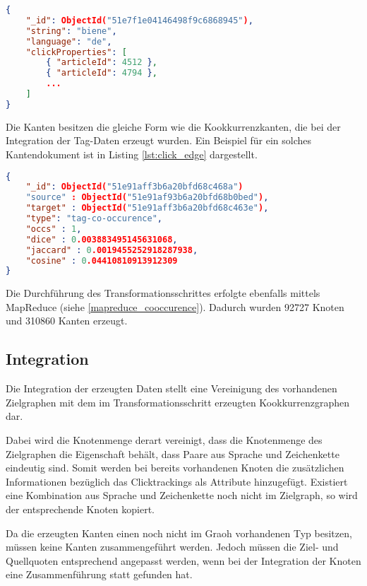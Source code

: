 \begin{lstlisting}[language=json, label={lst:click_node}, caption={Knotendokument mit Clicktracking-Eigenschaften}]
{
    "_id": ObjectId("51e7f1e04146498f9c6868945"),
    "string": "biene",
    "language": "de",
    "clickProperties": [
        { "articleId": 4512 },
        { "articleId": 4794 },
        ...
    ]
}
\end{lstlisting}

Die Kanten besitzen die gleiche Form wie die Kookkurrenzkanten, die bei der Integration der Tag-Daten erzeugt wurden. Ein Beispiel für ein solches Kantendokument ist in Listing \ref{lst:click_edge} dargestellt.

\begin{lstlisting}[language=json, label={lst:click_edge}, caption={Clicktracking-Kookkurrenzkante}]
{
    "_id": ObjectId("51e91aff3b6a20bfd68c468a")
    "source" : ObjectId("51e91af93b6a20bfd68b0bed"),
    "target" : ObjectId("51e91aff3b6a20bfd68c463e"),
    "type": "tag-co-occurence",
    "occs" : 1,
    "dice" : 0.003883495145631068,
    "jaccard" : 0.0019455252918287938,
    "cosine" : 0.04410810913912309
}
\end{lstlisting}

Die Durchführung des Transformationsschrittes erfolgte ebenfalls mittels MapReduce (siehe \ref{mapreduce_cooccurence}). Dadurch wurden \num{92727} Knoten und \num{310860} Kanten erzeugt.

\subsection{Integration}
\label{click_integration}

Die Integration der erzeugten Daten stellt eine Vereinigung des vorhandenen Zielgraphen mit dem im Transformationsschritt erzeugten Kookkurrenzgraphen dar.

Dabei wird die Knotenmenge derart vereinigt, dass die Knotenmenge des Zielgraphen die Eigenschaft behält, dass Paare aus Sprache und Zeichenkette eindeutig sind. Somit werden bei bereits vorhandenen Knoten die zusätzlichen Informationen bezüglich das Clicktrackings als Attribute hinzugefügt. Existiert eine Kombination aus Sprache und Zeichenkette noch nicht im Zielgraph, so wird der entsprechende Knoten kopiert.

Da die erzeugten Kanten einen noch nicht im Graoh vorhandenen Typ besitzen, müssen keine Kanten zusammengeführt werden. Jedoch müssen die Ziel- und Quellquoten entsprechend angepasst werden, wenn bei der Integration der Knoten eine Zusammenführung statt gefunden hat.

